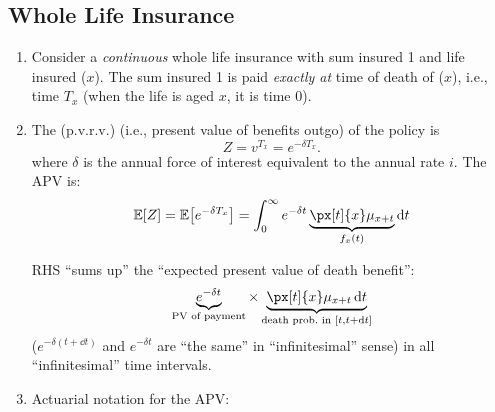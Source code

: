 \subsection{Whole Life Insurance}
\label{subsect:whole-life}
\begin{enumerate}
\subsubsection*{Continuous Case}
\item Consider a \emph{continuous} whole life insurance with sum insured 1
and life insured (\(x\)). The sum insured 1 is paid \emph{exactly at} time of
death of (\(x\)), i.e., time \(T_x\) (when the life is aged \(x\), it is time
0).

\item The  (p.v.r.v.) (i.e., present value
of benefits  outgo) of the policy is
\[
Z=v^{T_x}=e^{-\delta T_x}.
\]
where \(\delta\) is the annual force of interest equivalent to the annual rate
\(i\). The APV is:
\[
\expv{Z}=\expv{e^{-\delta T_x}}=\int_{0}^{\infty}e^{-\delta t}\underbrace{\px[t]{x}\mu_{x+t}}_{f_x(t)}\dd{t}
\]
\begin{intuition}
RHS ``sums up'' the ``expected present value of death benefit'':
\[\underbrace{e^{-\delta t}}_{\text{PV of payment}}\times
\underbrace{\px[t]{x}\mu_{x+t}\dd{t}}_{\text{death prob.\ in }[t,t+\dd{t}]}\]
(\(e^{-\delta(t+\dd{t})}\) and \(e^{-\delta t}\) are ``the same'' in
``infinitesimal'' sense) in all ``infinitesimal'' time intervals.
\end{intuition}
\item Actuarial notation for the APV:



\end{enumerate}
